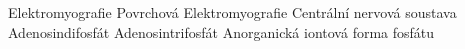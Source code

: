            {Elektromyografie}
          {Povrchová Elektromyografie}
           {Centrální nervová soustava}
           {Adenosindifosfát}
           {Adenosintrifosfát}
   {Anorganická iontová forma fosfátu}
